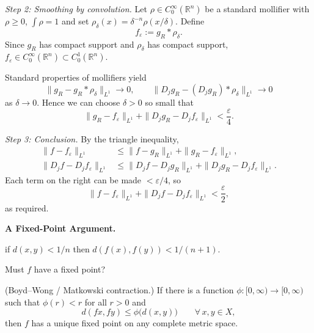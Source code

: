 \begin{solution}
\emph{Step 2: Smoothing by convolution.}
Let $\rho\in C_0^\infty(\mathbb{R}^n)$ be a standard mollifier with $\rho\ge0$,
$\int\rho=1$ and set $\rho_\delta(x)=\delta^{-n}\rho(x/\delta)$. Define
\[
f_\varepsilon := g_R * \rho_\delta.
\]
Since $g_R$ has compact support and $\rho_\delta$ has compact support,
$f_\varepsilon\in C_0^\infty(\mathbb{R}^n)\subset C_0^1(\mathbb{R}^n)$.

Standard properties of mollifiers yield
\[
\|g_R-g_R * \rho_\delta\|_{L^1}\to 0,
\qquad
\|D_j g_R-(D_j g_R)*\rho_\delta\|_{L^1}\to 0
\]
as $\delta\to 0$. Hence we can choose $\delta>0$ so small that
\[
\|g_R-f_\varepsilon\|_{L^1}
+\|D_j g_R-D_j f_\varepsilon\|_{L^1}<\frac{\varepsilon}{4}.
\]

\emph{Step 3: Conclusion.}
By the triangle inequality,
\[
\begin{aligned}
	\|f-f_\varepsilon\|_{L^1}
	&\le \|f-g_R\|_{L^1}+\|g_R-f_\varepsilon\|_{L^1}, \\
	\|D_j f-D_j f_\varepsilon\|_{L^1}
	&\le \|D_j f-D_j g_R\|_{L^1}
	+\|D_j g_R-D_j f_\varepsilon\|_{L^1}.
\end{aligned}
\]
Each term on the right can be made $<\varepsilon/4$, so
\[
\|f-f_\varepsilon\|_{L^1}
+\|D_j f-D_j f_\varepsilon\|_{L^1}<\frac{\varepsilon}{2},
\]
as required.
\end{solution}

\begin{problem}[CP-II-0391]
\label{prob:cp-ii-0391}
\textbf{A Fixed-Point Argument.}

\hspace*{1.5em}if $d(x,y)<1/n$ then $d(f(x),f(y))<1/(n+1)$.

Must $f$ have a fixed point?

\bigskip
\bigskip

(Boyd--Wong / Matkowski contraction.)
If there is a function $\phi:[0,\infty)\to[0,\infty)$ such that
$\phi(r)<r$ for all $r>0$ and
\[
d(fx,fy)\le \phi\big(d(x,y)\big)\qquad\forall\,x,y\in X,
\]
then $f$ has a unique fixed point on any complete metric space.

\bigskip
\end{problem}

